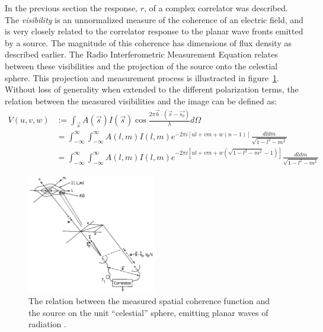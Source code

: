 \documentclass[a4paper,10pt]{report}
\begin{document}
In the previous section the response, $r$, of a complex correlator was described. The \textit{visibility} is an unnormalized measure of the coherence of an electric field, and is very closely related to the correlator response to the planar wave fronts emitted
by a source. The magnitude of this coherence has dimensions of flux density as described earlier. The Radio Interferometric Measurement Equation relates between these visibilities and the projection of the source onto the celestial sphere. This projection and measurement
process is illustracted in figure~\ref{fig_uvw_lmn}. Without loss of generality when extended to the different polarization terms, the relation between the measured visibilities and the image can be defined as:
\begin{equation}
 \label{eqn_visibility}
 \begin{split}
  V(u,v,w) &:= \int_{\vec{s}}{A(\vec{s})I(\vec{s})\cos{\frac{2\pi\vec{b}\cdot(\vec{s}-\vec{s_0})}{\lambda}}d\Omega}\\
	   &= \int_{-\infty}^\infty{\int_{-\infty}^\infty{A(l,m)I(l,m)e^{-2\pi i[ul+vm+w(n-1)]} \frac{dldm}{\sqrt{1-l^2-m^2}}}}\\
	   &= \int_{-\infty}^\infty{\int_{-\infty}^\infty{A(l,m)I(l,m)e^{-2\pi i[ul+vm+w(\sqrt{1-l^2-m^2}-1)]} \frac{dldm}{\sqrt{1-l^2-m^2}}}}
 \end{split}
\end{equation}

\begin{figure}[h]
 \begin{mdframed}
 \centering
 \includegraphics[width=0.5\textwidth]{images/lmn_uvw.png}
 \caption[The relation between image space and visibilities]{The relation between the measured spatial coherence function and the source on the unit ``celestial'' sphere, emitting planar waves of radiation \cite{taylor1999synthesis}.}
  \label{fig_uvw_lmn}
 \end{mdframed}
\end{figure}
\end{document}
